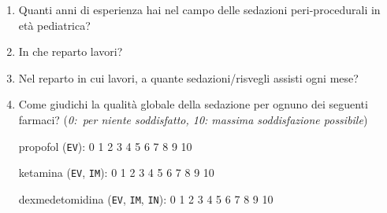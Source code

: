 \begin{tcolorbox}[breakable,title=Questionario sulla sedazione per infermieri/e,colback=xkcdCloudyBlue!40,colframe=xkcdCloudyBlue!40,coltitle=black,colbacktitle=xkcdCloudyBlue!75,fonttitle=\sffamily\mdseries\scshape,halign title=flush center, arc=3mm, boxrule=0pt]

\begin{enumerate}
           \item Quanti anni di esperienza hai nel campo delle sedazioni peri-procedurali in età pediatrica? 
           
           \item In che reparto lavori? 
           
           \item Nel reparto in cui lavori, a quante sedazioni/risvegli assisti ogni mese?
           
           \item Come giudichi la qualità globale della sedazione per ognuno dei seguenti farmaci? (\emph{0:~per niente soddisfatto, 10: massima soddisfazione possibile})
           
           propofol (\texttt{EV}): \hfill
           \colorbox{xkcdCloudyBlue!10}{0} \colorbox{xkcdCloudyBlue!10}{1} \colorbox{xkcdCloudyBlue!10}{2} \colorbox{xkcdCloudyBlue!10}{3} \colorbox{xkcdCloudyBlue!10}{4} \colorbox{xkcdCloudyBlue!10}{5} \colorbox{xkcdCloudyBlue!10}{6} \colorbox{xkcdCloudyBlue!10}{7} \colorbox{xkcdCloudyBlue!10}{8} \colorbox{xkcdCloudyBlue!10}{9} \colorbox{xkcdCloudyBlue!10}{10} 
            
           ketamina (\texttt{EV}, \texttt{IM}): \hfill \colorbox{xkcdCloudyBlue!10}{0} \colorbox{xkcdCloudyBlue!10}{1} \colorbox{xkcdCloudyBlue!10}{2} \colorbox{xkcdCloudyBlue!10}{3} \colorbox{xkcdCloudyBlue!10}{4} \colorbox{xkcdCloudyBlue!10}{5} \colorbox{xkcdCloudyBlue!10}{6} \colorbox{xkcdCloudyBlue!10}{7} \colorbox{xkcdCloudyBlue!10}{8} \colorbox{xkcdCloudyBlue!10}{9} \colorbox{xkcdCloudyBlue!10}{10}
           
            dexmedetomidina (\texttt{EV}, \texttt{IM}, \texttt{IN}): \hfill
            \colorbox{xkcdCloudyBlue!10}{0} \colorbox{xkcdCloudyBlue!10}{1} \colorbox{xkcdCloudyBlue!10}{2} \colorbox{xkcdCloudyBlue!10}{3} \colorbox{xkcdCloudyBlue!10}{4} \colorbox{xkcdCloudyBlue!10}{5} \colorbox{xkcdCloudyBlue!10}{6} \colorbox{xkcdCloudyBlue!10}{7} \colorbox{xkcdCloudyBlue!10}{8} \colorbox{xkcdCloudyBlue!10}{9} \colorbox{xkcdCloudyBlue!10}{10}
            

\end{enumerate}
\end{tcolorbox}
